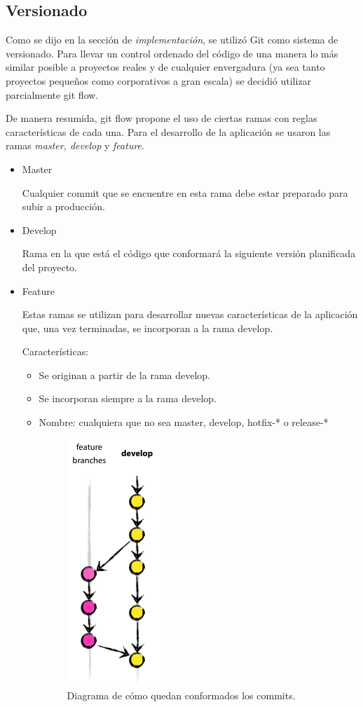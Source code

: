 \subsection{Versionado}
Como se dijo en la sección de \textit{implementación}, se utilizó Git como sistema de versionado.
Para llevar un control ordenado del código de una manera lo más similar posible a proyectos reales
y de cualquier envergadura (ya sea tanto proyectos pequeños como corporativos a gran escala) se
decidió utilizar parcialmente git flow. 

De manera resumida, git flow propone el uso de ciertas ramas con reglas características de cada
una. Para el desarrollo de la aplicación se usaron las ramas \textit{master, develop} y 
\textit{feature}.

\begin{itemize}
	\item Master
	
	Cualquier commit que se encuentre en esta rama debe estar preparado para subir a producción.
	
	\item Develop
	
	Rama en la que está el código que conformará la siguiente versión planificada del proyecto.
	
	\item Feature
	
	Estas ramas se utilizan para desarrollar nuevas características de la aplicación que, una vez
	terminadas, se incorporan a la rama develop.
	
	Características:
	\begin{itemize}
		\item Se originan a partir de la rama develop.
		\item Se incorporan siempre a la rama develop.
		\item Nombre: cualquiera que no sea master, develop, hotfix-* o release-*
		\begin{figure}
		\centering    
		\includegraphics[height=0.3\textheight]{feature_branches}
		\caption[featurebranches]{Diagrama de cómo quedan conformados los commits.}
		\label{fig:feature-branches}
		\end{figure}
	\end{itemize}

\end{itemize}
